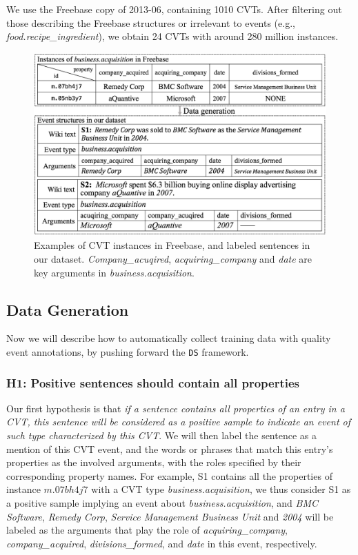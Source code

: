 We use the Freebase copy of 2013-06,  %
containing 1010 CVTs. After filtering out those %
describing the Freebase structures  or irrelevant to events (e.g., \emph{food.recipe\_ingredient}), we obtain 24 CVTs with around 280 million instances.    
%
\begin{figure}[h]
	\centering
	\includegraphics[width=.48\textwidth]{temp}
	\caption{Examples of CVT instances in Freebase, and labeled sentences in our dataset. \emph{Company\_acuqired}, \emph{acquiring\_company} and \emph{date} are key arguments in \emph{business.acquisition}. \label{fig:3}}
\end{figure}

\subsection{Data Generation\label{datagen}}
Now we will describe how to automatically collect training data with quality event annotations, by pushing forward the \texttt{DS} framework.
\subsubsection{H1: Positive sentences should contain all properties}
Our first hypothesis is that \textit{if a sentence contains all properties of an entry in a CVT, this sentence will be 
considered as a positive sample to indicate an event of such type characterized by this CVT}.  
We will then label the sentence as a mention of this CVT event, and the words or phrases that 
match this entry's properties as the involved arguments, with the roles specified by their 
corresponding property names. 
For example, S1 contains all the properties of instance $m.07bh4j7$ with a CVT type \emph{business.acquisition}, 
we thus consider S1 as a positive sample implying an event about \emph{business.acquisition}, and \emph{BMC Software}, \emph{Remedy Corp}, \emph{Service Management Business Unit} and \emph{2004} will be labeled as the arguments that play the role of \emph{acquiring\_company}, \emph{company\_acquired}, \emph{divisions\_formed}, and \emph{date} in this event, respectively.

